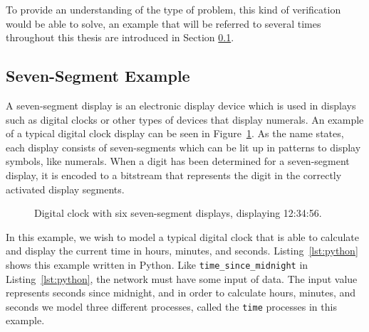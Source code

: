 To provide an understanding of the type of problem, this kind of verification would be able to solve, an example that will be referred to several times throughout this thesis are introduced in Section \ref{sec:example-seven_segment_intro}.

\subsection{Seven-Segment Example}
\label{sec:example-seven_segment_intro}
A seven-segment display is an electronic display device which is used in displays such as digital clocks or other types of devices that display numerals. An example of a typical digital clock display can be seen in Figure~\ref{fig:6_displays}. As the name states, each display consists of seven-segments which can be lit up in patterns to display symbols, like numerals.
When a digit has been determined for a seven-segment display, it is encoded to a bitstream that represents the digit in the correctly activated display segments.
\begin{figure}[!ht]
  \begin{center}
  \end{center}
  \caption{Digital clock with six seven-segment displays, displaying 12:34:56.}
  \label{fig:6_displays}
\end{figure}
In this example, we wish to model a typical digital clock that is able to calculate and display the current time in hours, minutes, and seconds. Listing~\ref{lst:python} shows this example written in Python. Like \texttt{time\_since\_midnight} in Listing~\ref{lst:python}, the network must have some input of data. The input value represents seconds since midnight, and in order to calculate hours, minutes, and seconds we model three different processes, called the \texttt{time} processes in this example.\\

